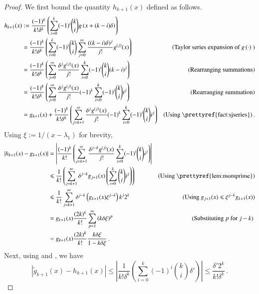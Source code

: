 \documentclass{article}[12pt]
\theoremstyle{definition}
\renewcommand{\leq}{\leqslant}
\newcommand{\mper}{\,.}
\newcommand{\paren}[1]{\left(#1 \right )}
\newcommand{\Abs}[1]{\left\lvert#1\right\rvert}
\newcommand{\defeq}{\stackrel{\textup{def}}{=}}
\renewcommand{\defeq}{:=}
\newcommand{\mom}{g}
\newcommand{\tg}{\tilde{g}}
\begin{document}
\begin{proof}
We first bound the quantity $h_{k+1}(x)$ defined as follows.
\begin{align*}
h_{k+1}(x) & \defeq \frac{(-1)^k}{k!\delta^{k}} \paren{ \sum_{i = 0}^{k} (-1)^i \binom{k}{i}  \mom \paren{x + (k-i)\delta }} \\
 & = \frac{(-1)^k}{k!\delta^{k}} \paren{ \sum_{i = 0}^{k} (-1)^i \binom{k}{i} 
		\sum_{j = 0}^\infty \frac{ ((k-i)\delta)^j  }{j!} \mom^{(j)}(x) } 
	& \textrm{(Taylor series expansion of $ \mom \paren{\cdot}$ )} \\
 & = \frac{(-1)^k}{k!\delta^{k}} \paren{ \sum_{j=0}^\infty  \frac{\delta^j \mom^{(j)}(x)}{j!}  
		\sum_{i = 0}^{k} (-1)^i \binom{k}{i} (k-i)^j}  
 	& \textrm{(Rearranging summations)} \\
 & = \frac{(-1)^k}{k!\delta^{k}} \paren{ \sum_{j=0}^\infty  \frac{\delta^j \mom^{(j)}(x)}{j!} 
		(-1)^k \sum_{i = 0}^{k} (-1)^i \binom{k}{i} i^j} 
 	& \textrm{(Rearranging summation)} \\
 & = \mom_{k+1}(x) + \frac{(-1)^k}{k!\delta^{k}} \paren{ \sum_{j=k+1}^\infty  \frac{\delta^j \mom^{(j)}(x)}{j!} 
		(-1)^k \sum_{i = 0}^{k} (-1)^i \binom{k}{i} i^j} & \textrm{(Using \prettyref{fact:sjseries})} \mper
\end{align*}
Using $\xi \defeq 1/(x-\lambda_1)$ for brevity,  
\begin{align*}
\Abs{ h_{k+1}(x) - \mom_{k+1}(x)} & = \Abs{\frac{(-1)^k}{k!} \paren{  \sum_{j=k+1}^\infty  \frac{\delta^{j-k} \mom^{(j)}(x)}{j!} 
		 \sum_{i = 0}^{k} (-1)^i \binom{k}{i} i^j }} \\ 
 & \leq \frac{1}{k!} \paren{  \sum_{j=k+1}^\infty  \delta^{j-k} \mom_{j+1}(x) 
		 \paren{ \sum_{i = 0}^{k}  \binom{k}{i} i^j }} 
		& \textrm{(Using \prettyref{lem:momprime})} \\
 & \leq \frac{1}{k!} \sum_{j=k+1}^\infty \delta^{j-k} \paren{ \mom_{k+1}(x) \xi^{j-k}} k^j 2^k 
	& \textrm{(Using $g_{j+1}(x) \leq \xi^{j-k} g_{k+1}(x)  $)}  \\
 & = \mom_{k+1}(x)  \frac{(2k)^k}{k!} \sum_{p=1}^\infty \paren{k \delta \xi}^{p}  
	& \textrm{(Substituting $p$ for $j-k$) }\\
 & = \mom_{k+1}(x)  \frac{(2k)^k}{k!} \frac{k \delta \xi}{1 - k \delta \xi} \mper
\end{align*}
Next, using  and , we have 
\begin{equation} 
\Abs{\tg_{k+1}(x) - h_{k+1}(x)}  \leq \Abs{\frac{1}{k!\delta^{k}} 
		\paren{ \sum_{i = 0}^{k} (-1)^i \binom{k}{i}  \delta'}} 
	\leq \frac{\delta' 2^k}{k! \delta^k} \mper 
\end{equation}



\end{proof}
\end{document}
